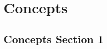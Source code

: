 %
\chapter{Concepts}
\label{sec:concepts}


\section{Concepts Section 1}
\label{sec:concepts:sec1}

